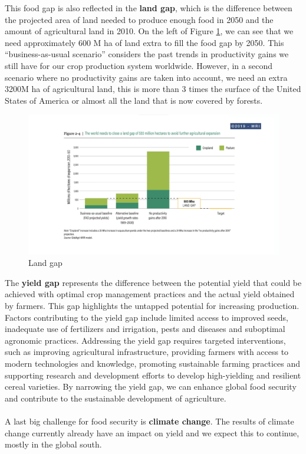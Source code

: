 \documentclass[../summary.tex]{subfiles}
\begin{document}
	This food gap is also reflected in the \textbf{land gap}, which is the difference between the projected area of land needed to produce enough food in 2050 and the amount of agricultural land in 2010. On the left of Figure \ref{fig:land_gap}, we can see that we need approximately 600 M ha of land extra to fill the food gap by 2050. This “business-as-usual scenario” considers the past trends in productivity gains we still have for our crop production system worldwide. However, in a second scenario where no productivity gains are taken into account, we need an extra 3200M ha of agricultural land, this is more than 3 times the surface of the United States of America or almost all the land that is now covered by forests.
	\\
	\begin{figure}[htbp]
		\centering
		\includegraphics[width=1\linewidth]{images/6-land-gap.png}
		\caption{Land gap}
		\label{fig:land_gap}
	\end{figure}
	
	The \textbf{yield gap} represents the difference between the potential yield that could be achieved with optimal crop management practices and the actual yield obtained by farmers. This gap highlights the untapped potential for increasing production. Factors contributing to the yield gap include limited access to improved seeds, inadequate use of fertilizers and irrigation, pests and diseases and suboptimal agronomic practices. Addressing the yield gap requires targeted interventions, such as improving agricultural infrastructure, providing farmers with access to modern technologies and knowledge, promoting sustainable farming practices and supporting research and development efforts to develop high-yielding and resilient cereal varieties. By narrowing the yield gap, we can enhance global food security and contribute to the sustainable development of agriculture.
	\\\\
	A last big challenge for food security is \textbf{climate change}. The results of climate change currently already have an impact on yield and we expect this to continue, mostly in the global south.
	\newpage
	
\end{document}

